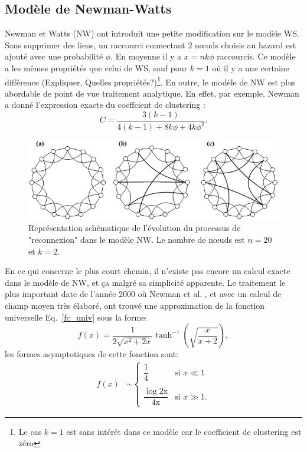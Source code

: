 \subsection{Modèle de Newman-Watts}
Newman et Watts (NW) \cite{Newman-Watts1999} ont introduit une petite modification sur le modèle WS. Sans supprimer des liens, un raccourci connectant $2$ nœuds choisis au hazard est ajouté avec une probabilité $\phi$. En moyenne il y a $x=nk\phi$ raccourcis. Ce modèle a les m\^{e}mes propriétés que celui de WS, sauf pour $k=1$ où il y a une certaine différence (Expliquer, Quelles propriétés?)\footnote{Le cas $k=1$ est sans intérêt dans ce modèle car le coefficient de clustering est zéro}. En outre, le modèle de NW est plus abordable de point de vue traitement analytique. En effet, par exemple, Newman a donné l'expression exacte du coeffcient de clustering \cite{Newman2010}:
\begin{equation}
C=\frac{3(k-1)}{4(k-1)+8k\phi+4k\phi^2}.
\end{equation}
	\begin{figure}[h!]
		\centering
		\includegraphics[scale=0.55]{./figures/fig-NW}
		\caption{Représentation schématique de l'évolution du processus de "reconnexion" dans le modèle NW.  Le nombre de nœuds est $n=20$ et $k=2$.}  	
		\label{NW}
	\end{figure}
En ce qui concerne le plus court chemin, il n'existe pas encore un calcul exacte dans le modèle de NW, et ça malgré sa simplicité apparente. Le traitement le plus important date de l'année $2000$ où Newman et al. \cite{Newman-al2000}, et avec un calcul de champ moyen très élaboré, ont trouvé une approximation de la fonction universelle Eq.~\eqref{fc_univ} sous la forme:
\begin{equation}
f(x)=\frac{1}{2\sqrt{x^2+2x}}\tanh^{-1}(\sqrt{\frac{x}{x+2}}),\label{eq-ws}
\end{equation}
les formes asymptotiques de cette fonction sont: 
\begin{align}
f(x)&\sim
\begin{cases}
\dfrac{1}{4} & \text{si } x \ll1\\
\\
\dfrac{\log\mathrm{2x}}{\mathrm{4x}}& \text{si } x \gg1.
\end{cases}
\end{align}
